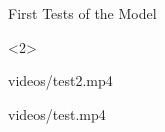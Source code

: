 \begin{frame}{First Tests of the Model}
\begin{onlyenv}<2>
\begin{minipage}{.5\textwidth}
        {videos/test2.mp4}
\end{minipage}%
\begin{minipage}{.5\textwidth}
        {videos/test.mp4}
\end{minipage}
\end{onlyenv}

\end{frame}

